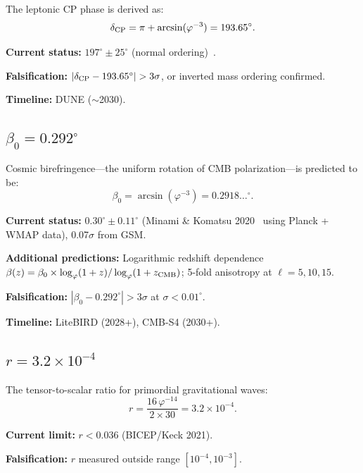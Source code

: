 \documentclass[aps,prd,twocolumn,superscriptaddress,nofootinbib,showpacs]{revtex4-2}
\newcommand{\zcmb}{z_{\rm CMB}}
\begin{document}
The leptonic CP phase is derived as:
\begin{equation}
\delta_{\rm CP} = \pi + \arcsin(\varphi^{-3}) = 193.65^\circ.
\label{eq:deltacp}
\end{equation}

\textbf{Current status:} $197^\circ \pm 25^\circ$ (normal
ordering)~\cite{PDG2024}.

\textbf{Falsification:} $|\delta_{\rm CP} - 193.65^\circ| > 3\sigma$,
or inverted mass ordering confirmed.

\textbf{Timeline:} DUNE ($\sim$2030).

\subsection{$\beta_0 = 0.292^\circ$}\label{sec:birefringence}

Cosmic birefringence---the uniform rotation of CMB polarization---is
predicted to be:
\begin{equation}
\beta_0 = \arcsin(\varphi^{-3}) = 0.2918\ldots^\circ.
\label{eq:birefringence}
\end{equation}

\textbf{Current status:} $0.30^\circ \pm 0.11^\circ$ (Minami \&
Komatsu 2020~\cite{MinamiKomatsu2020} using Planck + WMAP data),
0.07$\sigma$ from GSM.

\textbf{Additional predictions:} Logarithmic redshift dependence
$\beta(z) = \beta_0 \times \log_\varphi(1+z)/\log_\varphi(1+\zcmb)$;
5-fold anisotropy at $\ell = 5, 10, 15$.

\textbf{Falsification:} $|\beta_0 - 0.292^\circ| > 3\sigma$ at
$\sigma < 0.01^\circ$.

\textbf{Timeline:} LiteBIRD (2028+), CMB-S4 (2030+).

\subsection{$r = 3.2 \times 10^{-4}$}\label{sec:tensorscalar}

The tensor-to-scalar ratio for primordial gravitational waves:
\begin{equation}
r = \frac{16\,\varphi^{-14}}{2 \times 30} = 3.2 \times 10^{-4}.
\label{eq:tensorscalar}
\end{equation}

\textbf{Current limit:} $r < 0.036$ (BICEP/Keck 2021).

\textbf{Falsification:} $r$ measured outside range $[10^{-4},
10^{-3}]$.
\end{document}
